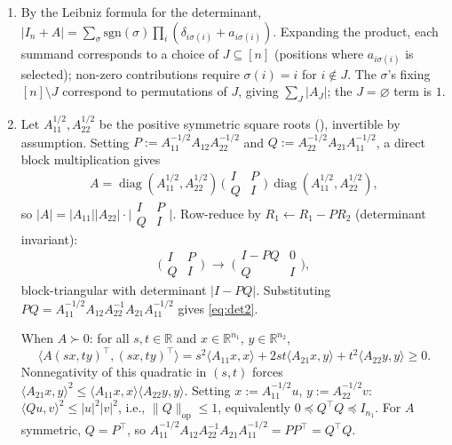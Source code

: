 \documentclass[14pt]{extarticle}
\makeatletter
\theoremstyle{definition}
\renewenvironment{proof}[1][\proofname]{\par
  \pushQED{\qed}%
  \normalfont \topsep6\p@\@plus6\p@\relax
  \trivlist
  \item[\hskip\labelsep\bfseries #1\@addpunct{.}]\ignorespaces
}{%
  \popQED\endtrivlist\@endpefalse
}
\newcommand{\R}{\mathbb{R}}
\newcommand{\diag}{\operatorname{diag}}
\makeatother
\begin{document}
\begin{proof}
  \leavevmode
  \begin{enumerate}[label=(\roman*)]
    \item By the Leibniz formula for the determinant,
      $|I_n+A|=\sum_\sigma\mathrm{sgn}(\sigma)\prod_i
      (\delta_{i\sigma(i)}+a_{i\sigma(i)})$.  Expanding the product, each
      summand corresponds to a choice of $J\subseteq[n]$ (positions where
      $a_{i\sigma(i)}$ is selected); non-zero contributions require
      $\sigma(i)=i$ for $i\notin J$.  The $\sigma$'s fixing $[n]\setminus J$
      correspond to permutations of $J$, giving $\sum_J|A_J|$; the
      $J=\varnothing$ term is $1$.

    \item Let $A_{11}^{1/2},A_{22}^{1/2}$ be the positive symmetric
      square roots (), invertible by assumption.
      Setting $P:=A_{11}^{-1/2}A_{12}A_{22}^{-1/2}$ and
      $Q:=A_{22}^{-1/2}A_{21}A_{11}^{-1/2}$, a direct block
      multiplication gives
      \[
        A=\diag(A_{11}^{1/2},A_{22}^{1/2})\,
        \bigl(\begin{smallmatrix}I&P\\Q&I\end{smallmatrix}\bigr)\,
        \diag(A_{11}^{1/2},A_{22}^{1/2}),
      \]
      so $|A|=|A_{11}||A_{22}|\cdot\bigl|
      \begin{smallmatrix}I&P\\Q&I\end{smallmatrix}\bigr|$.
      Row-reduce by $R_1\leftarrow R_1-PR_2$ (determinant invariant):
      \[
        \bigl(\begin{smallmatrix}I&P\\Q&I\end{smallmatrix}\bigr)
        \;\to\;
        \bigl(\begin{smallmatrix}I-PQ&0\\Q&I\end{smallmatrix}\bigr),
      \]
      block-triangular with determinant $|I-PQ|$.  Substituting
      $PQ=A_{11}^{-1/2}A_{12}A_{22}^{-1}A_{21}A_{11}^{-1/2}$ gives
      \eqref{eq:det2}.

      When $A\succ 0$: for all $s,t\in\R$ and $x\in\R^{n_1}$,
      $y\in\R^{n_2}$,
      \[
        \langle A(sx,ty)^\top,(sx,ty)^\top\rangle
        =s^2\langle A_{11}x,x\rangle+2st\langle A_{21}x,y\rangle
        +t^2\langle A_{22}y,y\rangle\geqslant 0.
      \]
      Nonnegativity of this quadratic in $(s,t)$ forces
      $\langle A_{21}x,y\rangle^2\leqslant\langle A_{11}x,x\rangle
      \langle A_{22}y,y\rangle$.
      Setting $x:=A_{11}^{-1/2}u$, $y:=A_{22}^{-1/2}v$:
      $\langle Qu,v\rangle^2\leqslant|u|^2|v|^2$, i.e.,
      $\|Q\|_{\mathrm{op}}\leqslant 1$, equivalently
      $0\preccurlyeq Q^\top Q\preccurlyeq I_{n_1}$.  For $A$ symmetric,
      $Q=P^\top$, so
      $A_{11}^{-1/2}A_{12}A_{22}^{-1}A_{21}A_{11}^{-1/2}=PP^\top=Q^\top Q$.
  \end{enumerate}
\end{proof}
\end{document}
